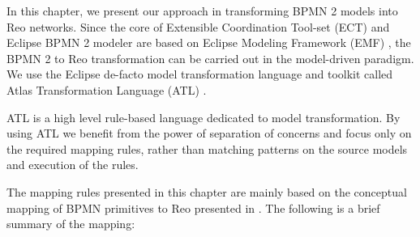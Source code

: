 In this chapter, we present our approach in transforming BPMN 2 models into Reo networks. Since the core of Extensible Coordination Tool-set (ECT) \cite{ect} and Eclipse BPMN 2 modeler \cite{activiti} are based on Eclipse Modeling Framework (EMF) \cite{emf}, the BPMN 2 to Reo transformation can be carried out in the {model-driven} paradigm. We use the Eclipse de-facto model transformation language and toolkit called Atlas Transformation Language (ATL) \cite{atl}. 

ATL is a high level rule-based language dedicated to model transformation. By using ATL we benefit from the power of separation of concerns and focus only on the required mapping rules, rather than matching patterns on the source models and execution of the rules. 

The mapping rules presented in this chapter are mainly based on the conceptual mapping of BPMN primitives to Reo presented in \cite{bpmn2reo} \cite{AS08}. The following is a brief summary of the mapping:

